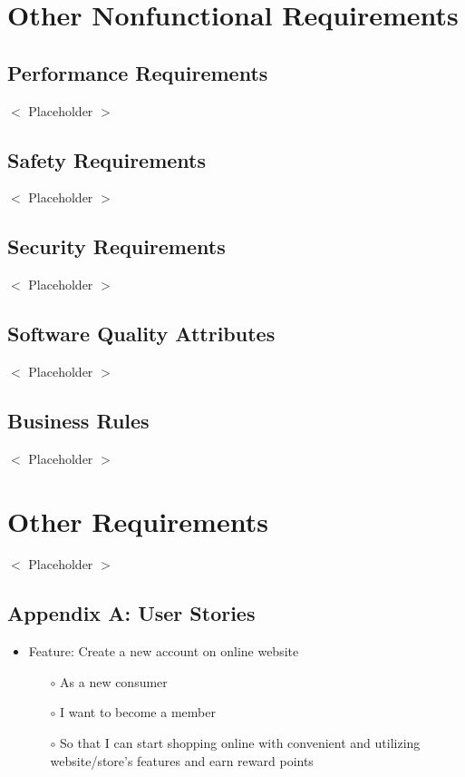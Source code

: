 \documentclass{scrreprt}
\begin{document}

\chapter{Other Nonfunctional Requirements}

\section{Performance Requirements}
$<$ Placeholder $>$

\section{Safety Requirements}
$<$ Placeholder $>$

\section{Security Requirements}
$<$ Placeholder $>$

\section{Software Quality Attributes}
$<$ Placeholder $>$

\section{Business Rules}
$<$ Placeholder $>$


\chapter{Other Requirements}
$<$ Placeholder $>$

\section{Appendix A: User Stories}
\begin{itemize}
	\item Feature: Create a new account on online website
	\begin{itemize}
		\item[$\circ$]As a new consumer
		\item[$\circ$]I want to become a member
		\item[$\circ$]So that I can start shopping online with convenient and utilizing website/store’s features and earn reward points
	\end{itemize}
\end{itemize}
\end{document}
